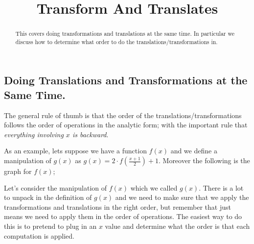 \documentclass{ximera}
\title{Transform And Translates}
\begin{document}
\begin{abstract}
    This covers doing transformations and translations at the same time. In particular we discuss how to determine what order to do the translations/transformations in.
\end{abstract}
\maketitle

\subsection*{Doing Translations and Transformations at the Same Time.}
    The general rule of thumb is that the order of the translations/transformations follows the order of operations in the analytic form; with the important rule that \textit{everything involving $x$ is backward}. 
    
    As an example, lets suppose we have a function $f(x)$ and we define a manipulation of $g(x)$ as $g(x) = 2 \cdot f\left(\frac{x+1}{2}\right) + 1$. Moreover the following is the graph for $f(x)$;
    
    \begin{center}
    \end{center}
    
    Let's consider the manipulation of $f(x)$ which we called $g(x)$. There is a lot to unpack in the definition of $g(x)$ and we need to make sure that we apply the transformations and translations in the right order, but remember that just means we need to apply them in the order of operations. The easiest way to do this is to pretend to plug in an $x$ value and determine what the order is that each computation is applied.
    
\end{document}
